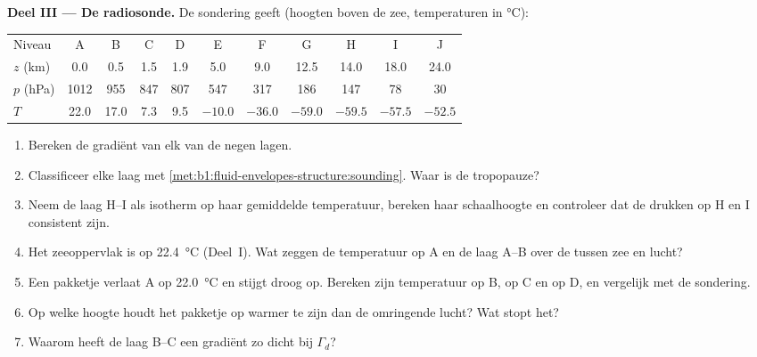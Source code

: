 \begin{problem}
\medskip
\noindent\textbf{Deel III --- De radiosonde.} De sondering geeft (hoogten boven de zee, temperaturen in \si{\celsius}):
\begin{center}
\small
\setlength{\tabcolsep}{4pt}
\begin{tabular}{|l|cccccccccc|}
\hline
Niveau & A & B & C & D & E & F & G & H & I & J \\
$z$ (km) & 0.0 & 0.5 & 1.5 & 1.9 & 5.0 & 9.0 & 12.5 & 14.0 & 18.0 & 24.0 \\
$p$ (hPa) & 1012 & 955 & 847 & 807 & 547 & 317 & 186 & 147 & 78 & 30 \\
$T$ & 22.0 & 17.0 & 7.3 & 9.5 & $-10.0$ & $-36.0$ & $-59.0$ & $-59.5$ & $-57.5$ & $-52.5$ \\
\hline
\end{tabular}
\end{center}
\begin{enumerate}[resume]
  \item Bereken de gradiënt van elk van de negen lagen.
  \item Classificeer elke laag met \cref{met:b1:fluid-envelopes-structure:sounding}. Waar is de tropopauze?
  \item Neem de laag H--I als isotherm op haar gemiddelde temperatuur, bereken haar schaalhoogte en controleer dat de drukken op H en I consistent zijn.
  \item Het zeeoppervlak is op \qty{22.4}{\celsius} (Deel~I). Wat zeggen de temperatuur op A en de laag A--B over de  tussen zee en lucht?
  \item Een pakketje verlaat A op \qty{22.0}{\celsius} en stijgt droog op. Bereken zijn temperatuur op B, op C en op D, en vergelijk met de sondering.
  \item Op welke hoogte houdt het pakketje op warmer te zijn dan de omringende lucht? Wat stopt het?
  \item Waarom heeft de laag B--C een gradiënt zo dicht bij $\Gamma_d$?
\end{enumerate}


\end{problem}
